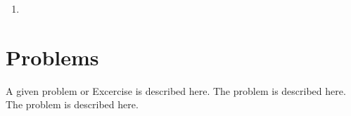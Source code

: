 \begin{enumerate}
	\item
\end{enumerate}


%
%
%


\section*{Problems}
%
\begin{prob}
\label{prob1}
A given problem or Excercise is described here. The
problem is described here. The problem is described here.
\end{prob}



